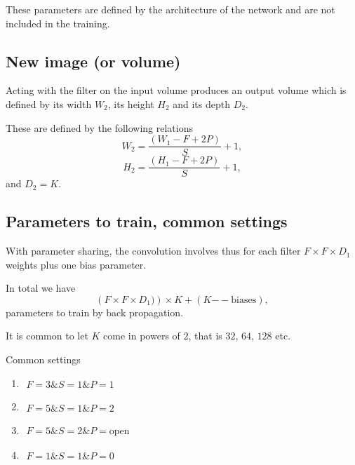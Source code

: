 \documentclass[%
oneside,                 %
final,                   %
10pt]{article}
\begin{document}
\noindent
These parameters are defined by the architecture of the network and are not included in the training.

\subsection{New image (or volume)}

Acting with the filter on the input volume produces an output volume
which is defined by its width $W_2$, its height $H_2$ and its depth
$D_2$.

These are defined by the following relations
\[
W_2 = \frac{(W_1-F+2P)}{S}+1,
\]
\[
H_2 = \frac{(H_1-F+2P)}{S}+1,
\]
and $D_2=K$.

\subsection{Parameters to train, common settings}

With parameter sharing, the convolution involves thus  for each filter  $F\times F\times D_1$ weights plus one bias parameter.

In total we have
\[
\left(F\times F\times D_1)\right) \times K+(K\mathrm{--biases}),
\]
parameters to train by back propagation.

It is common to let $K$ come in powers of $2$, that is $32$, $64$, $128$ etc.

\begin{block}{Common settings }
\begin{enumerate}
\item $\begin{array}{c} F=3 {\&} S=1 {\&} P=1 \end{array}$

\item $\begin{array}{c} F=5 {\&} S=1 {\&} P=2 \end{array}$

\item $\begin{array}{c} F=5 {\&} S=2 {\&} P=\mathrm{open} \end{array}$

\item $\begin{array}{c} F=1 {\&} S=1 {\&} P=0 \end{array}$
\end{enumerate}

\noindent
\end{block}
\end{document}
